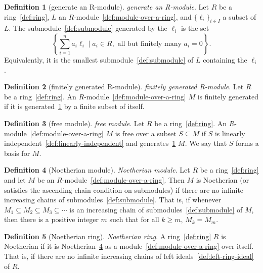 \documentclass[12pt,a4paper]{article}
\theoremstyle{definition}
\newtheorem{definition}{Definition}
\begin{document}
\begin{definition}[generate an R-module]\label{def:generate-an-r-module}
\emph{generate an R-module}. Let $R$ be a ring~\ref{def:ring}, $L$ an $R$-module~\ref{def:module-over-a-ring}, and $\{\ell_i\}_{i\in I}$ a subset of $L$. The submodule~\ref{def:submodule} generated by the $\ell_i$ is the set $$\left\{\sum_{i=1}^n a_i\ell_i\mid a_i\in R, \text{ all but finitely many } a_i=0\right\}.$$ Equivalently, it is the smallest submodule~\ref{def:submodule} of $L$ containing the $\ell_i$.
\end{definition}

\begin{definition}[finitely generated R-module]\label{def:finitely-generated-r-module}
\emph{finitely generated R-module}. Let $R$ be a ring~\ref{def:ring}. An $R$-module~\ref{def:module-over-a-ring} $M$ is finitely generated if it is generated~\ref{def:generate-an-r-module} by a finite subset of itself.
\end{definition}

\begin{definition}[free module]\label{def:free-module}
\emph{free module}. Let $R$ be a ring~\ref{def:ring}. An $R$-module~\ref{def:module-over-a-ring} $M$ is free over a subset $S\subseteq M$ if $S$ is linearly independent~\ref{def:linearly-independent} and generates~\ref{def:generate-an-r-module} $M$. We say that $S$ forms a basis for $M$.
\end{definition}

\begin{definition}[Noetherian module]\label{def:noetherian-module}
\emph{Noetherian module}. Let $R$ be a ring~\ref{def:ring} and let $M$ be an $R$-module~\ref{def:module-over-a-ring}. Then $M$ is Noetherian (or satisfies the ascending chain condition on submodules) if there are no infinite increasing chains of submodules~\ref{def:submodule}. That is, if whenever $M_1\subseteq M_2\subseteq M_3\subseteq \cdots$ is an increasing chain of submodules~\ref{def:submodule} of $M$, then there is a positive integer $m$ such that for all $k\geq m$, $M_k=M_m$.
\end{definition}

\begin{definition}[Noetherian ring]\label{def:noetherian-ring}
\emph{Noetherian ring}. A ring~\ref{def:ring} $R$ is Noetherian if it is Noetherian~\ref{def:noetherian-module} as a module~\ref{def:module-over-a-ring} over itself. That is, if there are no infinite increasing chains of left ideals~\ref{def:left-ring-ideal} of $R$.
\end{definition}
\end{document}
